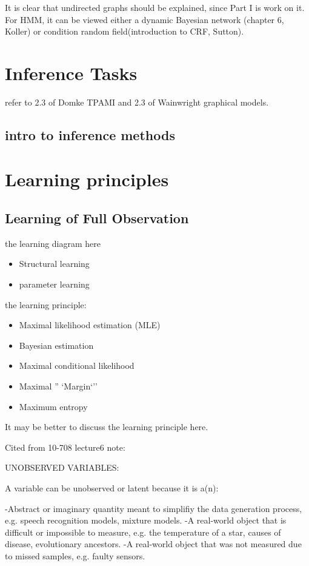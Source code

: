 It is clear that undirected graphs should be explained, since Part I is work on it. For HMM, it can be viewed either a dynamic Bayesian network (chapter 6, Koller) or condition random field(introduction to CRF, Sutton).

\section{Inference Tasks}
\label{sec:background-graphial-reppresentation}
refer to 2.3 of Domke TPAMI and 2.3 of Wainwright graphical models.

\subsection{intro to inference methods}
\section{Learning principles}
\subsection{Learning of Full Observation}

the learning diagram here
\begin{itemize}
\item Structural learning
\item parameter learning
\end{itemize}


the learning principle:
\begin{itemize}
\item Maximal likelihood estimation (MLE)
\item Bayesian estimation
\item Maximal conditional likelihood
\item Maximal '' `Margin`''
\item Maximum entropy
\end{itemize}


It may be better to discuss the learning principle here.

Cited from 10-708 lecture6 note:

UNOBSERVED VARIABLES:

A variable can be unobserved or latent because it is a(n):

-Abstract or imaginary quantity meant to simplifiy the data generation process, e.g. speech recognition models, mixture models.
-A real-world object that is difficult or impossible to measure, e.g. the temperature of a star, causes of disease, evolutionary ancestors.
-A real-world object that was not measured due to missed samples, e.g. faulty sensors.

